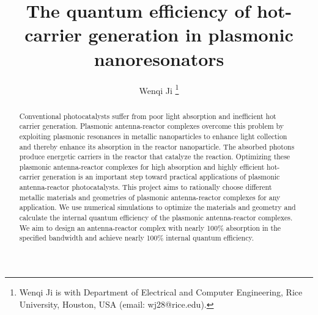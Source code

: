 \documentclass[journal]{IEEEtran}
\begin{document}
\title{The quantum efficiency of hot-carrier generation in plasmonic nanoresonators}

\author{Wenqi Ji
\thanks{Wenqi Ji is with Department of Electrical and Computer Engineering, Rice University, Houston, USA (email: wj28@rice.edu).}
}

\maketitle

\begin{abstract}
Conventional photocatalysts suffer from poor light absorption and inefficient hot carrier generation. Plasmonic antenna-reactor complexes overcome this problem by exploiting plasmonic resonances in metallic nanoparticles to enhance light collection and thereby enhance its absorption in the reactor nanoparticle. The absorbed photons produce energetic carriers in the reactor that catalyze the reaction. Optimizing these plasmonic antenna-reactor complexes for high absorption and highly efficient hot-carrier generation is an important step toward practical applications of plasmonic antenna-reactor photocatalysts. This project aims to rationally choose different metallic materials and geometries of plasmonic antenna-reactor complexes for any application. We use numerical simulations to optimize the materials and geometry and calculate the internal quantum efficiency of the plasmonic antenna-reactor complexes. We aim to design an antenna-reactor complex with nearly 100\% absorption in the specified bandwidth and achieve nearly 100\% internal quantum efficiency.
\end{abstract}

\end{document}
